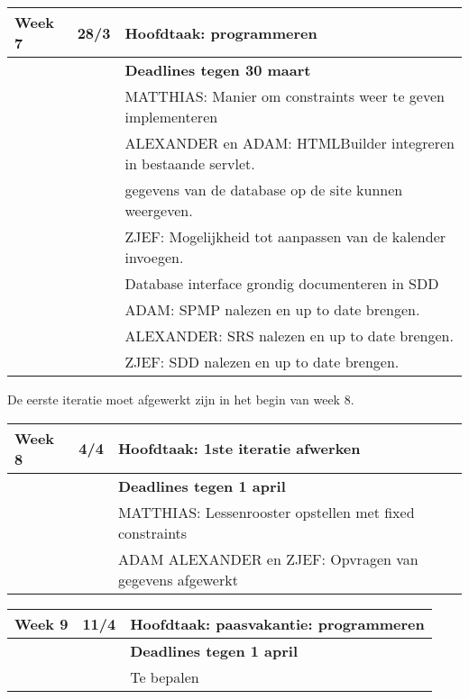\documentclass{article}
\begin{document}
\begin{center}
\begin{tabular}[t]{|p{1.3cm}|p{0.8cm}|p{9cm}|}
\hline
Week 7	& 28/3 &	\textbf{Hoofdtaak:} programmeren \\
\hline
 & & \textbf{Deadlines tegen 30 maart} \\
 & & MATTHIAS: Manier om constraints weer te geven implementeren \\
 & & ALEXANDER en ADAM: HTMLBuilder integreren in bestaande servlet. \\
 & & gegevens van de database op de site kunnen weergeven. \\
 & & ZJEF: Mogelijkheid tot aanpassen van de kalender invoegen. \\
 & & Database interface grondig documenteren in SDD \\
 & & ADAM: SPMP nalezen en up to date brengen. \\
 & & ALEXANDER: SRS nalezen en up to date brengen. \\
 & & ZJEF: SDD nalezen en up to date brengen. \\
\hline
\end{tabular}
\end{center}

De eerste iteratie moet afgewerkt zijn in het begin van week 8.

\begin{center}
\begin{tabular}[t]{|p{1.3cm}|p{0.8cm}|p{9cm}|}
\hline
Week 8	& 4/4 &	\textbf{Hoofdtaak:} 1ste iteratie afwerken  \\
\hline
\hline
 & & \textbf{Deadlines tegen 1 april} \\
 & & MATTHIAS: Lessenrooster opstellen met fixed constraints \\
 & & ADAM ALEXANDER en ZJEF: Opvragen van gegevens afgewerkt \\
\hline 
\end{tabular}
\end{center}

\begin{center}
\begin{tabular}[t]{|p{1.3cm}|p{0.8cm}|p{9cm}|}
\hline
Week 9	 & 11/4 &	\textbf{Hoofdtaak:} paasvakantie: programmeren \\
\hline
 & & \textbf{Deadlines tegen 1 april} \\
 & & Te bepalen \\
\hline
\end{tabular}
\end{center}
\end{document}
